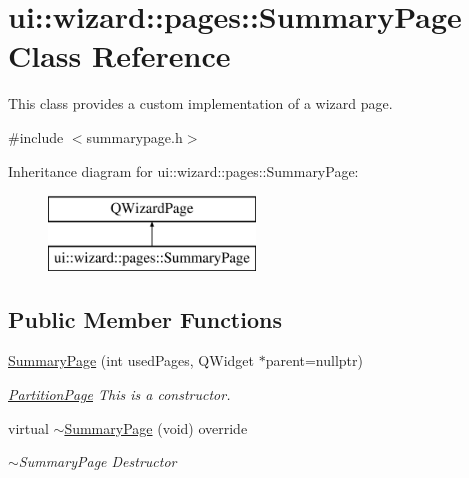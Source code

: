 \hypertarget{classui_1_1wizard_1_1pages_1_1_summary_page}{}\section{ui\+:\+:wizard\+:\+:pages\+:\+:Summary\+Page Class Reference}
\label{classui_1_1wizard_1_1pages_1_1_summary_page}


This class provides a custom implementation of a wizard page.  




{\ttfamily \#include $<$summarypage.\+h$>$}

Inheritance diagram for ui\+:\+:wizard\+:\+:pages\+:\+:Summary\+Page\+:\begin{figure}[H]
\begin{center}
\leavevmode
\includegraphics[height=2.000000cm]{classui_1_1wizard_1_1pages_1_1_summary_page}
\end{center}
\end{figure}
\subsection*{Public Member Functions}
\begin{DoxyCompactItemize}
\item 
\mbox{\hyperlink{classui_1_1wizard_1_1pages_1_1_summary_page_a798aff071dddd63b2b5ee049fa87e6a7}{Summary\+Page}} (int used\+Pages, Q\+Widget $\ast$parent=nullptr)
\begin{DoxyCompactList}\small\item\em \mbox{\hyperlink{classui_1_1wizard_1_1pages_1_1_partition_page}{Partition\+Page}} This is a constructor. \end{DoxyCompactList}\item 
virtual \mbox{\hyperlink{classui_1_1wizard_1_1pages_1_1_summary_page_a93b880d988f9f85f28c3d239ce1457e0}{$\sim$\+Summary\+Page}} (void) override
\begin{DoxyCompactList}\small\item\em $\sim$\+Summary\+Page Destructor \end{DoxyCompactList}\end{DoxyCompactItemize}

